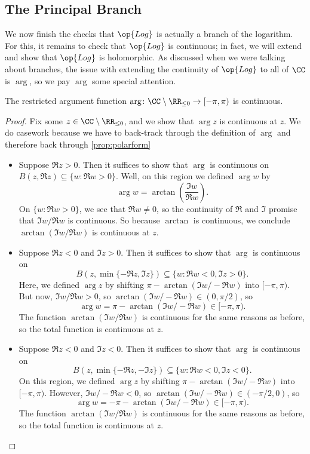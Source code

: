 \documentclass[../notes.tex]{subfiles}
\begin{document}
\subsection{The Principal Branch}
We now finish the checks that $\op{Log}$ is actually a branch of the logarithm. For this, it remains to check that $\op{Log}$ is continuous; in fact, we will extend and show that $\op{Log}$ is holomorphic. As discussed when we were talking about branches, the issue with extending the continuity of $\op{Log}$ to all of $\CC$ is $\arg$, so we pay $\arg$ some special attention.
\begin{lemma} \label{lem:argcont}
	The restricted argument function $\arg\colon \CC\setminus\RR_{\le0}\to[-\pi,\pi)$ is continuous.
\end{lemma}
\begin{proof}
	Fix some $z\in\CC\setminus\RR_{\le0}$, and we show that $\arg z$ is continuous at $z$. We do casework because we have to back-track through the definition of $\arg$ and therefore back through \autoref{prop:polarform}
	\begin{itemize}
		\item Suppose $\Re z>0$. Then it suffices to show that $\arg$ is continuous on $B(z,\Re z)\subseteq\{w:\Re w>0\}$. Well, on this region we defined $\arg w$ by
		\[\arg w=\arctan\left(\frac{\Im w}{\Re w}\right).\]
		On $\{w:\Re w>0\}$, we see that $\Re w\ne0$, so the continuity of $\Re$ and $\Im$ promise that $\Im w/\Re w$ is continuous. So because $\arctan$ is continuous, we conclude $\arctan(\Im w/\Re w)$ is continuous at $z$.
		\item Suppose $\Re z<0$ and $\Im z>0$. Then it suffices to show that $\arg$ is continuous on
		\[B(z,\min\{-\Re z,\Im z\})\subseteq\{w:\Re w<0,\Im z>0\}.\]
		Here, we defined $\arg z$ by shifting $\pi-\arctan(\Im w/-\Re w)$ into $[-\pi,\pi)$. But now, $\Im w/\Re w>0$, so $\arctan(\Im w/-\Re w)\in(0,\pi/2)$, so
		\[\arg w=\pi-\arctan(\Im w/-\Re w)\in[-\pi,\pi).\]
		The function $\arctan(\Im w/\Re w)$ is continuous for the same reasons as before, so the total function is continuous at $z$.
		\item Suppose $\Re z<0$ and $\Im z<0$. Then it suffices to show that $\arg$ is continuous on
		\[B(z,\min\{-\Re z,-\Im z\})\subseteq\{w:\Re w<0,\Im z<0\}.\]
		On this region, we defined $\arg z$ by shifting $\pi-\arctan(\Im w/-\Re w)$ into $[-\pi,\pi)$. However, $\Im w/-\Re w<0$, so $\arctan(\Im w/-\Re w)\in(-\pi/2,0)$, so
		\[\arg w=-\pi-\arctan(\Im w/-\Re w)\in[-\pi,\pi).\]
		The function $\arctan(\Im w/\Re w)$ is continuous for the same reasons as before, so the total function is continuous at $z$.

\end{itemize}
\end{proof}
\end{document}
